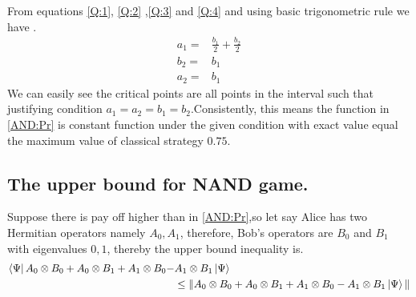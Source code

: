 From equations \ref{Q:1}, \ref{Q:2} ,\ref{Q:3} and \ref{Q:4} and using basic trigonometric rule  we have .
\begin{align}
a_1=&\frac{b_1}{2}+\frac{b_2}{2}\label{QQ:1}\\
b_2=&b_1\label{QQ:2}\\
a_2=&b_1\label{QQ:3}
\end{align} 
We can easily see the critical points are all points in the interval such  that justifying  condition $a_1=a_2= b_1=b_2$.Consistently,  this means the function in \ref{AND:Pr} is constant function under the given condition with exact value equal the maximum value of classical strategy $0.75$.
\subsection{The upper bound for NAND game.}\hfill \break
Suppose  there is pay off higher than  in \ref{AND:Pr},so let say Alice has two Hermitian  operators  namely $A_0 ,A_1$, therefore, Bob's operators are $B_0$ and $B_1$  with eigenvalues $0,1$, thereby the upper bound inequality is.
\begin{align}\label{GGG}
\bra{\Psi} A_0\otimes B_0+A_0\otimes B_1+A_1\otimes B_0-& A_1\otimes B_1 \ket{\Psi}\nonumber\\
& \leq \| A_0\otimes B_0+A_0\otimes B_1+A_1\otimes B_0-A_1\otimes B_1 \ket{\Psi} \|
\end{align}



